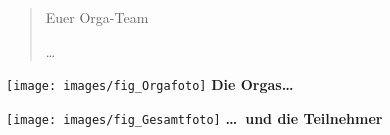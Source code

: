 \thispagestyle{empty}



\begin{quote}
  Euer Orga-Team

  {\authorfont \ldots}
\end{quote}

\newpage
\thispagestyle{empty}

\vfill

\begin{center}
  \texttt{[image: images/fig\_Orgafoto]}
  \medskip
  \small{\textbf{Die Orgas\quad \ldots}
  }

  \vskip0pt

  \texttt{[image: images/fig\_Gesamtfoto]}
  \medskip
  \small{\textbf{\ldots~und die Teilnehmer}}
\end{center}

\vfill

\newpage

\endinput
